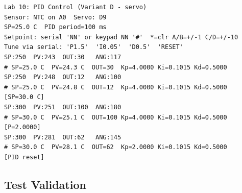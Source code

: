 \documentclass[12pt]{article}
\begin{document}
\begin{lstlisting}
Lab 10: PID Control (Variant D - servo)
Sensor: NTC on A0  Servo: D9
SP=25.0 C  PID period=100 ms
Setpoint: serial 'NN' or keypad NN '#'  *=clr A/B=+/-1 C/D=+/-10
Tune via serial: 'P1.5'  'I0.05'  'D0.5'  'RESET'
SP:250  PV:243  OUT:30   ANG:117
# SP=25.0 C  PV=24.3 C  OUT=30  Kp=4.0000 Ki=0.1015 Kd=0.5000
SP:250  PV:248  OUT:12   ANG:100
# SP=25.0 C  PV=24.8 C  OUT=12  Kp=4.0000 Ki=0.1015 Kd=0.5000
[SP=30.0 C]
SP:300  PV:251  OUT:100  ANG:180
# SP=30.0 C  PV=25.1 C  OUT=100 Kp=4.0000 Ki=0.1015 Kd=0.5000
[P=2.0000]
SP:300  PV:281  OUT:62   ANG:145
# SP=30.0 C  PV=28.1 C  OUT=62  Kp=2.0000 Ki=0.1015 Kd=0.5000
[PID reset]
\end{lstlisting}

\subsection{Test Validation}
\end{document}
